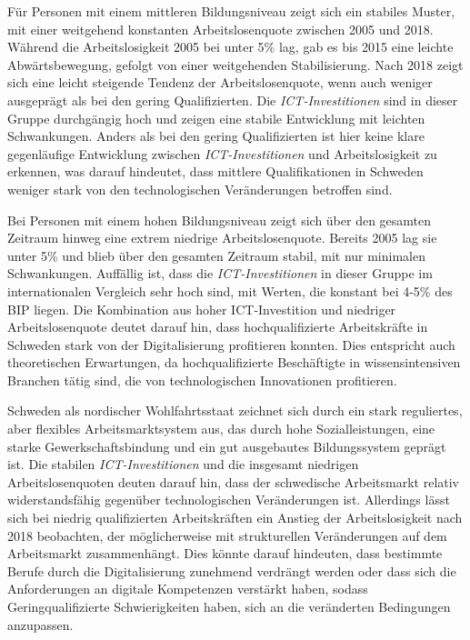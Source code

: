 Für Personen mit einem mittleren Bildungsniveau zeigt sich ein stabiles Muster, mit 
einer weitgehend konstanten Arbeitslosenquote zwischen 2005 und 2018. Während die 
Arbeitslosigkeit 2005 bei unter 5\% lag, gab es bis 2015 eine leichte Abwärtsbewegung, 
gefolgt von einer weitgehenden Stabilisierung. Nach 2018 zeigt sich eine leicht steigende 
Tendenz der Arbeitslosenquote, wenn auch weniger ausgeprägt als bei den gering 
Qualifizierten. Die \textit{\ac{ICT}-Investitionen} sind in dieser Gruppe durchgängig 
hoch und zeigen eine stabile Entwicklung mit leichten Schwankungen. Anders als bei den 
gering Qualifizierten ist hier keine klare gegenläufige Entwicklung zwischen 
\textit{\ac{ICT}-Investitionen} und Arbeitslosigkeit zu erkennen, was darauf hindeutet, 
dass mittlere Qualifikationen in Schweden weniger stark von den technologischen 
Veränderungen betroffen sind.

Bei Personen mit einem hohen Bildungsniveau zeigt sich über den gesamten Zeitraum 
hinweg eine extrem niedrige Arbeitslosenquote. Bereits 2005 lag sie unter 5\% und blieb 
über den gesamten Zeitraum stabil, mit nur minimalen Schwankungen. Auffällig ist, dass 
die \textit{\ac{ICT}-Investitionen} in dieser Gruppe im internationalen Vergleich sehr 
hoch sind, mit Werten, die konstant bei 4-5\% des \ac{BIP} liegen. Die Kombination aus 
hoher \ac{ICT}-Investition und niedriger Arbeitslosenquote deutet darauf hin, dass 
hochqualifizierte Arbeitskräfte in Schweden stark von der Digitalisierung profitieren 
konnten. Dies entspricht auch theoretischen Erwartungen, da hochqualifizierte 
Beschäftigte in wissensintensiven Branchen tätig sind, die von technologischen 
Innovationen profitieren.

Schweden als nordischer Wohlfahrtsstaat zeichnet sich durch ein stark reguliertes, 
aber flexibles Arbeitsmarktsystem aus, das durch hohe Sozialleistungen, eine starke 
Gewerkschaftsbindung und ein gut ausgebautes Bildungssystem geprägt ist. Die stabilen 
\textit{\ac{ICT}-Investitionen} und die insgesamt niedrigen Arbeitslosenquoten deuten 
darauf hin, dass der schwedische Arbeitsmarkt relativ widerstandsfähig gegenüber 
technologischen Veränderungen ist. Allerdings lässt sich bei niedrig qualifizierten 
Arbeitskräften ein Anstieg der Arbeitslosigkeit nach 2018 beobachten, der 
möglicherweise mit strukturellen Veränderungen auf dem Arbeitsmarkt zusammenhängt. 
Dies könnte darauf hindeuten, dass bestimmte Berufe durch die Digitalisierung 
zunehmend verdrängt werden oder dass sich die Anforderungen an digitale Kompetenzen 
verstärkt haben, sodass Geringqualifizierte Schwierigkeiten haben, sich an die 
veränderten Bedingungen anzupassen. %

